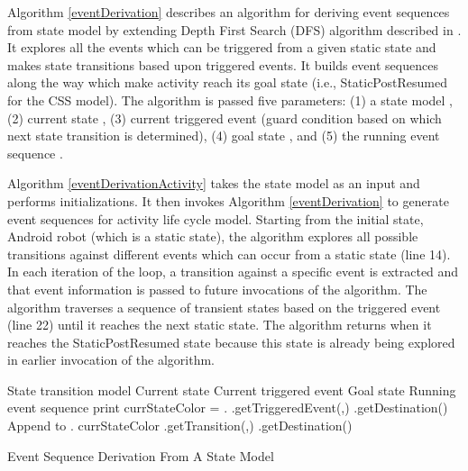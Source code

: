 \documentclass[10pt]{elsarticle}
\newlength{\algorithmwidth}
\begin{document}
Algorithm \ref{eventDerivation} describes an algorithm for deriving event sequences from state model  by extending Depth First Search (DFS) algorithm described in \cite{Cormen}. It explores all the events which can be triggered from a given static state and makes state transitions based upon triggered events. It builds event sequences along the way which make activity reach its goal state (i.e., StaticPostResumed for the CSS model). The algorithm is passed five parameters: (1) a state model , (2) current state , (3) current triggered event  (guard condition based on which next state transition is determined), (4) goal state , and (5) the running event sequence . 

Algorithm \ref{eventDerivationActivity} takes the state model  as an input and performs initializations. It then invokes Algorithm \ref{eventDerivation} to generate event sequences for activity life cycle model. Starting from the initial state, Android robot (which is a static state), the algorithm explores all possible transitions against different events which can occur from a static state (line 14). In each iteration of the loop, a transition against a specific event is extracted and that event information is passed to future invocations of the algorithm. The algorithm traverses a sequence of transient states based on the triggered event (line 22) until it reaches the next static state. The algorithm returns when it reaches the StaticPostResumed state because this state is already being explored in earlier invocation of the algorithm.


\setlength{\algorithmwidth}{.95\textwidth}

\begin{algorithm}[ht!]
 \begin{algorithmic}[1]
 \INPUT 
\Statex  \Comment State transition model
\Statex  \Comment  Current state
\Statex  \Comment Current triggered event
\Statex  \Comment Goal state
\Statex  \Comment Running event sequence
 {}
		\State print   
		\State \Return
		\State \Return
	\Else
			\State currStateColor = .
			\Else 
			\EndIf    
				\State   .getTriggeredEvent(,)
				\State   .getDestination()
				\State   
				\If{} 	
					\State Append  to  
				\EndIf	
			\EndFor
		       \State .  currStateColor
			\State   .getTransition(,) 
			\State   .getDestination()
			\If{}  
			\EndIf
		\EndIf
	\EndIf 	
\EndProcedure

  \end{algorithmic}
 \caption{Event Sequence Derivation From A State Model}
 \label{eventDerivation}
\end{algorithm}
\end{document}
